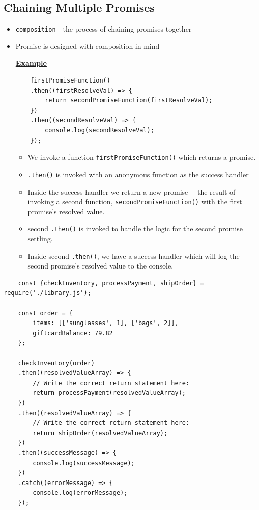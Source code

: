 \documentclass[12pt]{article}
\begin{document}
\subsection{Chaining Multiple Promises}
\begin{itemize}
    \item \texttt{composition} - the process of chaining promises together
    \item Promise is designed with composition in mind

    \bigskip

    \underline{\textbf{Example}}

    \begin{lstlisting}
    firstPromiseFunction()
    .then((firstResolveVal) => {
        return secondPromiseFunction(firstResolveVal);
    })
    .then((secondResolveVal) => {
        console.log(secondResolveVal);
    });
    \end{lstlisting}

    \begin{itemize}
        \item We invoke a function \texttt{firstPromiseFunction()} which returns a promise.
        \item \texttt{.then()} is invoked with an anonymous function as the success handler
        \item Inside the success handler we return a new promise— the result of invoking a second function, \texttt{secondPromiseFunction()} with the first promise’s resolved value.
        \item second \texttt{.then()} is invoked to handle the logic for the second promise settling.
        \item Inside second \texttt{.then()}, we have a success handler which will log the second promise’s resolved value to the console.
    \end{itemize}
\end{itemize}

    \begin{lstlisting}
    const {checkInventory, processPayment, shipOrder} = require('./library.js');

    const order = {
        items: [['sunglasses', 1], ['bags', 2]],
        giftcardBalance: 79.82
    };

    checkInventory(order)
    .then((resolvedValueArray) => {
        // Write the correct return statement here:
        return processPayment(resolvedValueArray);
    })
    .then((resolvedValueArray) => {
        // Write the correct return statement here:
        return shipOrder(resolvedValueArray);
    })
    .then((successMessage) => {
        console.log(successMessage);
    })
    .catch((errorMessage) => {
        console.log(errorMessage);
    });

    \end{lstlisting}
\end{document}
